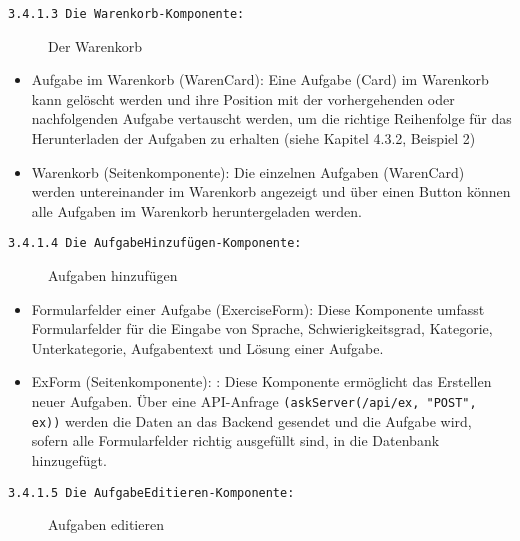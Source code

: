 \newpage
\texttt{3.4.1.3 Die Warenkorb-Komponente:}


\begin{figure}[H]
  \caption{Der Warenkorb \cite{fig:warenkorb}}
\end{figure}

\begin{itemize}

\item Aufgabe im Warenkorb (WarenCard):
Eine Aufgabe (Card) im Warenkorb kann gelöscht werden und ihre Position mit der vorhergehenden oder nachfolgenden Aufgabe vertauscht werden, um die richtige Reihenfolge für das Herunterladen der Aufgaben zu erhalten (siehe Kapitel 4.3.2, Beispiel 2)


\item Warenkorb (Seitenkomponente):
Die einzelnen Aufgaben (WarenCard) werden untereinander im Warenkorb angezeigt und über einen Button können alle Aufgaben im Warenkorb heruntergeladen werden.


\end{itemize}

\texttt{3.4.1.4 Die AufgabeHinzufügen-Komponente:}
\begin{figure}[H]
  \caption{Aufgaben hinzufügen \cite{fig:hinzufuegen}}
\end{figure}

\begin{itemize}

\item{Formularfelder einer Aufgabe (ExerciseForm)}:
Diese Komponente umfasst Formularfelder für die Eingabe von Sprache, Schwierigkeitsgrad, Kategorie, Unterkategorie, Aufgabentext und Lösung einer Aufgabe.

\item ExForm (Seitenkomponente): :
Diese Komponente ermöglicht das Erstellen neuer Aufgaben. Über eine API-Anfrage \texttt{(askServer(/api/ex, "POST", ex))} werden die Daten an das Backend gesendet und die Aufgabe wird, sofern alle Formularfelder richtig ausgefüllt sind, in die Datenbank hinzugefügt.


\end{itemize}

\texttt{3.4.1.5 Die AufgabeEditieren-Komponente:}
\begin{figure}[H]
  \caption{Aufgaben editieren \cite{fig:editieren}}
\end{figure}

